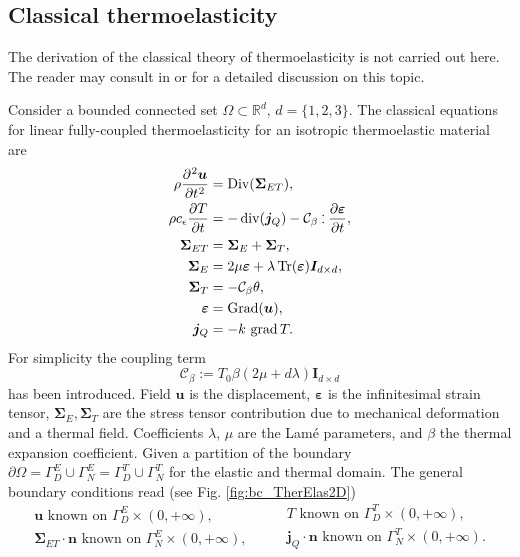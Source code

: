 \subsection{Classical thermoelasticity}
The derivation of the classical theory of thermoelasticity is not carried out here. The reader may consult in \cite[Chapter 1]{hetnarski2009thermal} or \cite[Chapter 8]{abeyaratne2012notes} for a detailed discussion on this topic. 

Consider a bounded connected set $\Omega \subset \mathbb{R}^d, \, d=\{1,2,3\}$. The classical equations for linear fully-coupled thermoelasticity for an isotropic thermoelastic material are \cite{biot1956thermoelasticity,carlson1973}
\begin{equation}\label{eq:sysThElas}
\begin{aligned}
\displaystyle \rho \diffp[2]{\bm{u}}{t} &= \Div(\bm{\Sigma}_{ET}) , \\
\displaystyle \rho c_\epsilon \diffp{T}{t} &= -\div(\bm{j}_Q) - \mathcal{C}_\beta \cddot \displaystyle\diffp{\bm{\varepsilon}}{t}, \\
\bm{\Sigma}_{ET} &= \bm{\Sigma}_E + \bm{\Sigma}_{T}, \\
\bm{\Sigma}_E &= 2\mu \bm{\varepsilon} + \lambda \Tr(\bm{\varepsilon}) \bm{I}_{d\times d}, \\
\bm{\Sigma}_T &= - \mathcal{C}_\beta \theta,  \\
\bm{\varepsilon} &= \Grad(\bm{u}), \\
\bm{j}_Q &= -k \, \grad T.
\end{aligned}
\end{equation}
For simplicity  the coupling term
\[\mathcal{C}_\beta:=T_0 \beta(2\mu + d \lambda)\bm{I}_{d\times d} \]
has been introduced. Field $\bm{u}$ is the displacement, $\bm{\varepsilon}$ is the infinitesimal strain tensor, $\bm{\Sigma}_E, \bm{\Sigma}_T$ are the stress tensor contribution due to mechanical deformation and a thermal field. Coefficients $\lambda,\, \mu$ are the Lam\'e parameters,  and $\beta$ the thermal expansion coefficient. Given a partition of the boundary $\partial \Omega = \Gamma_D^E \cup \Gamma_N^E = \Gamma_D^T \cup \Gamma_N^T$ for the elastic and thermal domain. The general boundary conditions read (see Fig. \ref{fig:bc_TherElas2D})
\begin{equation}
\begin{aligned}
\bm{u} \text{ known on } \Gamma_D^E \times (0, +\infty), \\
\bm{\Sigma}_{ET} \cdot \bm{n} \text{ known on } \Gamma_N^E \times (0, +\infty), 
\end{aligned} \qquad
\begin{aligned}
T \text{ known on } \Gamma_D^T \times (0, +\infty), \\
\bm{j}_Q \cdot \bm{n} \text{ known on } \Gamma_N^T \times (0, +\infty).
\end{aligned}
\end{equation}
